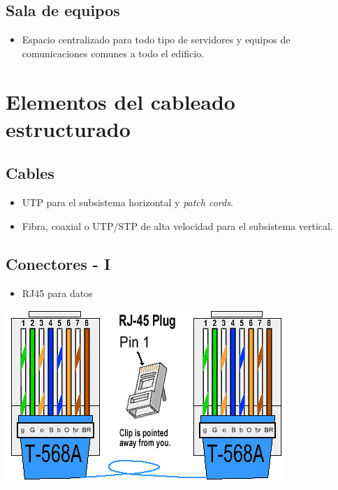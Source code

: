 \documentclass[11pt]{article}
\begin{document}
\subsection{Sala de equipos}
\label{sec:orgcccd9e0}
\begin{itemize}
\item Espacio centralizado para todo tipo de servidores y equipos de comunicaciones comunes a todo el edificio.
\end{itemize}

\section{Elementos del cableado estructurado}
\label{sec:orgb28bddb}
\subsection{Cables}
\label{sec:orgad77743}
\begin{itemize}
\item UTP para el subsistema horizontal y \emph{patch cords}.
\item Fibra, coaxial o UTP/STP de alta velocidad para el subsistema vertical.
\end{itemize}
\subsection{Conectores - I}
\label{sec:org5c97213}
\begin{itemize}
\item RJ45 para datos
\end{itemize}
\begin{center}
\includegraphics[width=.9\linewidth]{./media/RJ45-Pinout.png}
\end{center}
\end{document}
